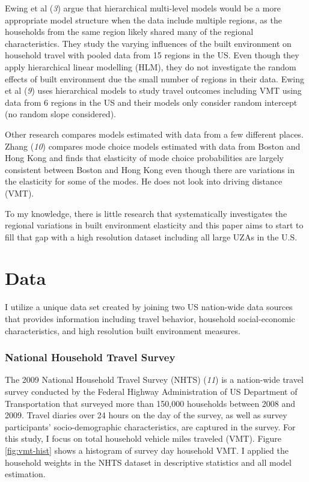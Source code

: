 \documentclass[numbered]{trbunofficial}
\begin{document}
Ewing et al (\emph{3}) argue that hierarchical multi-level models would be a more appropriate model structure when the data include multiple regions, as the households from the same region likely shared many of the regional characteristics. They study the varying influences of the built environment on household travel with pooled data from 15 regions in the US. Even though they apply hierarchical linear modelling (HLM), they do not investigate the random effects of built environment due the small number of regions in their data. Ewing et al (\emph{9}) uses hierarchical models to study travel outcomes including VMT using data from 6 regions in the US and their models only consider random intercept (no random slope considered).

Other research compares models estimated with data from a few different places. Zhang (\emph{10}) compares mode choice models estimated with data from Boston and Hong Kong and finds that elasticity of mode choice probabilities are largely consistent between Boston and Hong Kong even though there are variations in the elasticity for some of the modes. He does not look into driving distance (VMT).

To my knowledge, there is little research that systematically investigates the regional variations in built environment elasticity and this paper aims to start to fill that gap with a high resolution dataset including all large UZAs in the U.S.

\hypertarget{data}{%
\section{Data}\label{data}}

I utilize a unique data set created by joining two US nation-wide data sources that provides information including travel behavior, household social-economic characteristics, and high resolution built environment measures.

\hypertarget{national-household-travel-survey}{%
\subsubsection{National Household Travel Survey}\label{national-household-travel-survey}}

The 2009 National Household Travel Survey (NHTS) (\emph{11}) is a nation-wide travel survey conducted by the Federal Highway Administration of US Department of Transportation that surveyed more than 150,000 households between 2008 and 2009. Travel diaries over 24 hours on the day of the survey, as well as survey participants' socio-demographic characteristics, are captured in the survey. For this study, I focus on total household vehicle miles traveled (VMT). Figure \ref{fig:vmt-hist} shows a histogram of survey day household VMT. I applied the household weights in the NHTS dataset in descriptive statistics and all model estimation.
\end{document}
